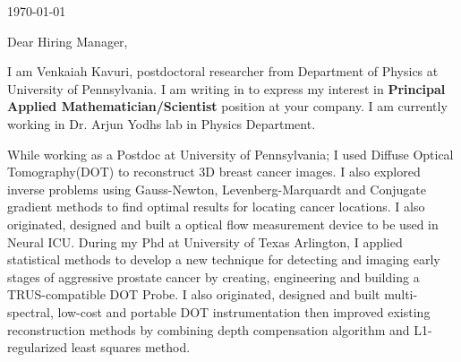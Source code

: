 \documentclass{my_cv}
\begin{document}
\vspace{-2mm}
\begin{center} 
\begin{footnotesize}
\end{footnotesize}

\href{https://www.linkedin.com/in/venkaiahchowdarykavuri}{\faLinkedinSquare} \href{https://github.com/Venki-Kavuri}{\faGithub} \href{https://scholar.google.com/citations?hl=en&user=r5E9ACIAAAAJ&view_op=list_works}{\aiGoogleScholar} \href{https://www.facebook.com/venki.kavuri}{\faFacebookOfficial}
\end{center} 
\vspace{5mm} 
\today\\
\vspace{5mm} 



Dear Hiring Manager,\\
\vspace{2mm} 

I am Venkaiah Kavuri, postdoctoral researcher from Department of Physics at University of Pennsylvania. I am writing in to express my interest in  \textbf{Principal Applied Mathematician/Scientist} position at your company. I am currently working in Dr. Arjun Yodh\textquotesingle s lab in Physics Department.
\vspace{2mm} 

While working as a Postdoc at University of Pennsylvania; I used Diffuse Optical Tomography(DOT) to reconstruct 3D breast cancer images. I also explored inverse problems using Gauss-Newton, Levenberg-Marquardt and Conjugate gradient methods to find optimal results for locating cancer locations. I also originated, designed and built a optical flow measurement device to be used in Neural ICU.  During my Phd at University of Texas Arlington, I applied statistical methods to develop a new technique for detecting and imaging early stages of aggressive prostate cancer by creating, engineering and building a TRUS-compatible DOT Probe. I also originated, designed and built multi-spectral, low-cost and portable DOT instrumentation then improved existing reconstruction methods by combining depth compensation algorithm and L1-regularized least squares method.\\
\end{document}
